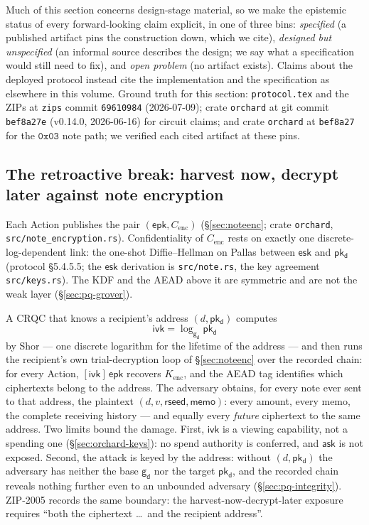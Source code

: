 \documentclass[11pt,a4paper]{article}
\theoremstyle{definition}
\newcommand{\ask}{\ensuremath{\mathsf{ask}}}
\newcommand{\ivk}{\ensuremath{\mathsf{ivk}}}
\newcommand{\pkd}{\ensuremath{\mathsf{pk_d}}}
\newcommand{\gd}{\ensuremath{\mathsf{g_d}}}
\begin{document}
Much of this section concerns design-stage material, so we make the epistemic
status of every forward-looking claim explicit, in one of three bins:
\emph{specified} (a published artifact pins the construction down, which we
cite), \emph{designed but unspecified} (an informal source describes the
design; we say what a specification would still need to fix), and \emph{open
problem} (no artifact exists). Claims about the deployed protocol instead cite
the implementation and the specification as elsewhere in this volume. Ground
truth for this section: \texttt{protocol.tex} and the ZIPs at \texttt{zips}
commit \texttt{69610984} (2026-07-09); crate \texttt{orchard} at git commit
\texttt{bef8a27e} (v0.14.0, 2026-06-16) for circuit claims; and crate
\texttt{orchard} at \texttt{bef8a27} for the $\mathtt{0x03}$ note path; we
verified each cited artifact at these pins.

\subsection{The retroactive break: harvest now, decrypt later against note
encryption}\label{sec:pq-hndl}

Each Action publishes the pair $(\mathsf{epk}, C_{\mathrm{enc}})$
(\S\ref{sec:noteenc}; crate \texttt{orchard},
\texttt{src/note\_encryption.rs}). Confidentiality of $C_{\mathrm{enc}}$ rests
on exactly one discrete-log-dependent link: the one-shot Diffie--Hellman on
Pallas between $\mathsf{esk}$ and $\pkd$ (protocol \S5.4.5.5; the
$\mathsf{esk}$ derivation is \texttt{src/note.rs}, the key agreement
\texttt{src/keys.rs}). The KDF and the AEAD above it are symmetric and are not
the weak layer (\S\ref{sec:pq-grover}).

A CRQC that knows a recipient's address $(d, \pkd)$ computes
\[
\ivk = \log_{\gd} \pkd
\]
by Shor --- one discrete logarithm for the lifetime of the address --- and then
runs the recipient's own trial-decryption loop of \S\ref{sec:noteenc} over the
recorded chain: for every Action, $[\ivk]\,\mathsf{epk}$ recovers
$K_{\mathrm{enc}}$, and the AEAD tag identifies which ciphertexts belong to the
address. The adversary obtains, for every note ever sent to that address, the
plaintext $(d, v, \mathsf{rseed}, \mathsf{memo})$: every amount, every memo,
the complete receiving history --- and equally every \emph{future} ciphertext
to the same address. Two limits bound the damage. First, $\ivk$ is a viewing
capability, not a spending one (\S\ref{sec:orchard-keys}): no spend authority
is conferred, and $\ask$ is not exposed. Second, the attack is keyed by the
address: without $(d, \pkd)$ the adversary has neither the base $\gd$ nor the
target $\pkd$, and the recorded chain reveals nothing further even to an
unbounded adversary (\S\ref{sec:pq-integrity}). ZIP-2005 records the same
boundary: the harvest-now-decrypt-later exposure requires ``both the
ciphertext \dots\ and the recipient address''.
\end{document}
